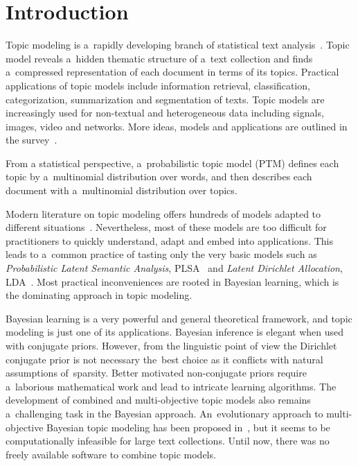 \documentclass{acm_proc_article-sp}
\begin{document}

\section{Introduction}

Topic modeling is a~rapidly developing branch of statistical text analysis~\cite{blei12ptm}.
Topic model reveals a~hidden thematic structure of a~text collection
and finds a~compressed representation of each document in terms of its topics.
Practical applications of topic models include
information retrieval,
classification, categorization, summarization and segmentation of texts.
Topic models are increasingly used for non-textual and heterogeneous data
including signals, images, video and networks.
More ideas, models and applications are outlined in the survey~\cite{daud10knowledge}.

From a statistical perspective,
a~probabilistic topic model (PTM)
defines each topic by a~multinomial distribution over words,
and then describes each document with a~multinomial distribution over topics.

Modern literature on topic modeling offers
hundreds of models adapted to different situations~\cite{daud10knowledge}.
Nevertheless,
most of these models are too difficult for practitioners
to quickly understand, adapt and embed into applications.
This leads to a~common practice of tasting only the very basic models such as
\emph{Probabilistic Latent Semantic Analysis}, PLSA~\cite{hofmann99plsi} and
\emph{Latent Dirichlet Allocation}, LDA~\cite{blei03latent}.
Most practical inconveniences are rooted in Bayesian learning,
which is the dominating approach in topic modeling.

Bayesian learning is a very powerful and general theoretical framework,
and topic modeling is just one of its applications.
Bayesian inference is elegant when used with conjugate priors.
However, from the linguistic point of view the Dirichlet conjugate prior
is not necessary the~best choice
as it conflicts with natural assumptions of~sparsity.
Better motivated non-conjugate priors
require a~laborious mathematical work and
lead to intricate learning algorithms.
The development of combined and multi-objective topic models also remains a~challenging task in the Bayesian approach.
An~evolutionary approach to multi-objective Bayesian topic modeling has been proposed in~\cite{khalifa13multi},
but it seems to be computationally infeasible for large text collections.
Until now, there was no freely available software to combine topic models.
\end{document}
